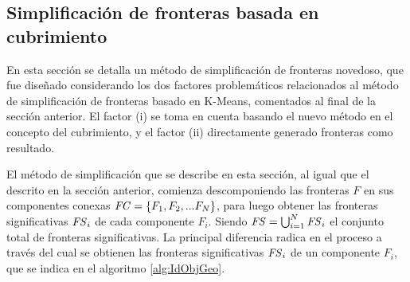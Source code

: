 \subsection{Simplificación de fronteras basada en cubrimiento}\label{subsec:MiSimp}
En esta sección se detalla un método de simplificación de fronteras novedoso,
que fue diseñado considerando los dos factores problemáticos relacionados al
método de simplificación de fronteras basado en K-Means, comentados
al final de la sección anterior. El factor (i) se toma en cuenta basando el
nuevo método en el concepto del cubrimiento, y el factor (ii) directamente
generado fronteras como resultado.

El método de simplificación que se describe en esta sección, al igual que el
descrito en la sección anterior, comienza descomponiendo las fronteras $F$ en
sus componentes conexas $\mathit{FC}=\{F_1,F_2,...F_N\}$, para luego obtener las
fronteras significativas $\mathit{FS}_i$ de cada componente $F_i$. Siendo
$\mathit{FS} = \bigcup^N_{i=1} \mathit{FS}_i$ el conjunto total de fronteras
significativas. La principal diferencia radica en el proceso a través del cual
se obtienen las fronteras significativas $\mathit{FS}_i$ de un componente $F_i$, que
se indica en el algoritmo \ref{alg:IdObjGeo}.

